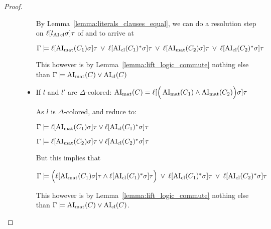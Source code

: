 \documentclass[,%
	paper=a4,%
	DIV12, %
	twoside=false,%
	liststotoc,
	bibtotoc,
	draft=false,%
	numbers=noendperiod
]{scrartcl}
\begin{document}
\begin{proof}
\begin{description}
\begin{itemize}
					By Lemma~\ref{lemma:literals_clauses_equal}, we can do a resolution step on $\ell[l_{\operatorname{AI}\mathrm{cl}}\sigma]\tau$ of \markA{} and \markB{} to arrive at 

					$\Gamma \models \ell[\operatorname{AI}_\mathrm{mat}(C_1)\sigma]\tau \;\,{\lor}\;\, \ell[\operatorname{AI}_\mathrm{cl}(C_1)^*\sigma]\tau\;\,{\lor}\;\, 
					\ell[\operatorname{AI}_\mathrm{mat}(C_2)\sigma]\tau\;\,{\lor}\;\, \ell[\operatorname{AI}_\mathrm{cl}(C_2)^*\sigma]\tau $

					This however is by Lemma~\ref{lemma:lift_logic_commute} nothing else than
					$\Gamma \models \operatorname{AI}_\mathrm{mat}(C) \lor \operatorname{AI}_\mathrm{cl}(C)$

				\item If $l$ and $l'$ are $\Delta$-colored:
					$\operatorname{AI}_\mathrm{mat}(C) = \ell[\Big(\operatorname{AI}_\mathrm{mat}(C_1) \land \operatorname{AI}_\mathrm{mat}(C_2)\Big)\sigma] \tau$

					As $l$ is $\Delta$-colored, \markA{} and \markB{} reduce to:

					$\Gamma \models \ell[\operatorname{AI}_\mathrm{mat}(C_1)\sigma]\tau \lor \ell[\operatorname{AI}_\mathrm{cl}(C_1)^*\sigma]\tau$

					$\Gamma \models \ell[\operatorname{AI}_\mathrm{mat}(C_2)\sigma]\tau \lor \ell[\operatorname{AI}_\mathrm{cl}(C_2)^*\sigma]\tau$

					But this implies that 

					$\Gamma \models \Big(\ell[\operatorname{AI}_\mathrm{mat}(C_1)\sigma]\tau \land \ell[\operatorname{AI}_\mathrm{cl}(C_1)^*\sigma]\tau\Big) 
					\;\,{\lor}\;\, \ell[\operatorname{AI}_\mathrm{cl}(C_1)^*\sigma]\tau
					\;\,{\lor}\;\, \ell[\operatorname{AI}_\mathrm{cl}(C_2)^*\sigma]\tau$

					This however is by Lemma~\ref{lemma:lift_logic_commute} nothing else than 
					$\Gamma \models \operatorname{AI}_\mathrm{mat}(C) \lor \operatorname{AI}_\mathrm{cl}(C)$.
					\qedhere
			\end{itemize}

	\end{description}
\end{proof}
\end{document}
